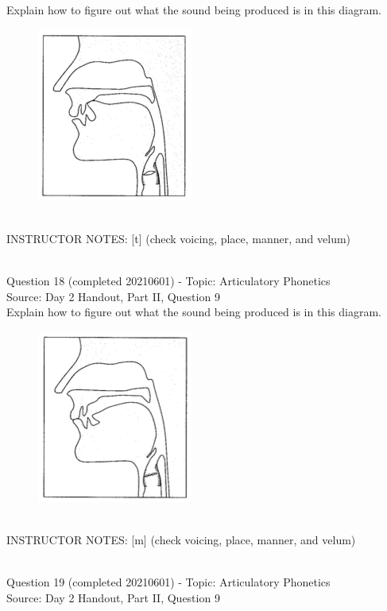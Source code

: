 \documentclass[12pt]{article}
\begin{document}
Explain how to figure out what the sound being produced is in this diagram.\\

\begin{figure}[H]
\includegraphics{../images/sagittal_t.png}
\end{figure}

~\\
INSTRUCTOR NOTES: [t] (check voicing, place, manner, and velum)


~\\

{\large Question 18} (completed 20210601) - Topic: Articulatory Phonetics\\
Source: Day 2 Handout, Part II, Question 9\\

Explain how to figure out what the sound being produced is in this diagram.\\

\begin{figure}[H]
\includegraphics{../images/sagittal_m.png}
\end{figure}

~\\
INSTRUCTOR NOTES: [m] (check voicing, place, manner, and velum)


~\\

{\large Question 19} (completed 20210601) - Topic: Articulatory Phonetics\\
Source: Day 2 Handout, Part II, Question 9\\
\end{document}
